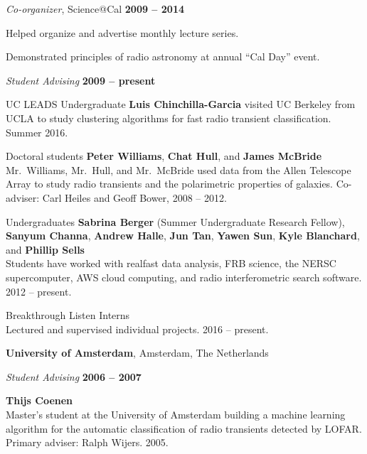 \documentclass[11pt]{article}
\newcommand{\halfblankline}{\quad\vspace{-0.5\baselineskip}\pagebreak[3]}
\begin{document}
\begin{outerlist}
\item[] \textit{Co-organizer}, Science@Cal
    \hfill \textbf{2009 -- 2014}
    \begin{innerlist}
        \item Helped organize and advertise monthly lecture series.
        \item Demonstrated principles of radio astronomy at annual ``Cal Day'' event.
    \end{innerlist}

\item[] \textit{Student Advising}
    \hfill \textbf{2009 -- present}
    \begin{innerlist}
      \item UC LEADS Undergraduate \textbf{Luis Chinchilla-Garcia} visited UC Berkeley from UCLA to study clustering algorithms for fast radio transient classification. Summer 2016.
      \item Doctoral students \textbf{Peter Williams}, \textbf{Chat Hull}, and \textbf{James McBride} \\
        Mr.\ Williams, Mr.\ Hull, and Mr.\ McBride used data from the Allen Telescope Array to study radio transients and the polarimetric properties of galaxies. Co-adviser: Carl Heiles and Geoff Bower, 2008 -- 2012.
      \item Undergraduates \textbf{Sabrina Berger} (Summer Undergraduate Research Fellow), \textbf{Sanyum Channa}, \textbf{Andrew Halle}, \textbf{Jun Tan}, \textbf{Yawen Sun}, \textbf{Kyle Blanchard}, and \textbf{Phillip Sells} \\
        Students have worked with realfast data analysis, FRB science, the NERSC supercomputer, AWS cloud computing, and radio interferometric search software.
        2012 -- present.
      \item Breakthrough Listen Interns \\
        Lectured and supervised individual projects. 2016 -- present.
     \end{innerlist}
\end{outerlist}

\halfblankline

\textbf{University of Amsterdam}, Amsterdam, The Netherlands
\begin{outerlist}

\item[] \textit{Student Advising}
    \hfill \textbf{2006 -- 2007}
    \begin{innerlist}
       \item \textbf{Thijs Coenen}\\
        Master's student at the University of Amsterdam building 
        a machine learning algorithm for the automatic classification 
        of radio transients detected by LOFAR.
        Primary adviser: Ralph Wijers.
        2005.
     \end{innerlist}
\end{outerlist}
\end{document}
